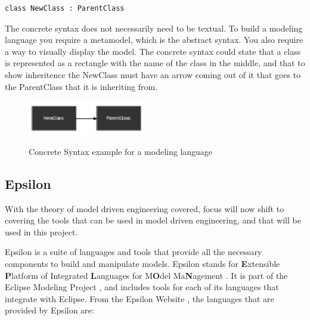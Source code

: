 \begin{lstlisting}
class NewClass : ParentClass
\end{lstlisting}

The concrete syntax does not necessarily need to be textual. To build a modeling language you require a metamodel, which is the abstract syntax. You also require a way to visually display the model. The concrete syntax could state that a class is represented as a rectangle with the name of the class in the middle, and that to show inheritence the NewClass must have an arrow coming out of it that goes to the ParentClass that it is inheriting from.

\begin{figure}[h]
\begin{center}
	\includegraphics[width=2in]{figures/concrete_syntax.png}
	\label{concreteSyntaxFigure}
	\caption{Concrete Syntax example for a modeling language}
\end{center}
\end{figure}

\subsection{Epsilon}
With the theory of model driven engineering covered, focus will now shift to covering the tools that can be used in model driven engineering, and that will be used in this project.

Epsilon is a suite of languages and tools that provide all the necessary components to build and manipulate models. Epsilon stands for \textbf{E}xtensible \textbf{P}latform of Integrated \textbf{L}anguages for M\textbf{O}del Ma\textbf{N}agement \citep{epsilonWebsite}. It is part of the Eclipse Modeling Project \citep{ecliplseModelingProjectSite}, and includes tools for each of its languages that integrate with Eclipse. From the Epsilon Website \citep{epsilonWebsite}, the languages that are provided by Epsilon are:

